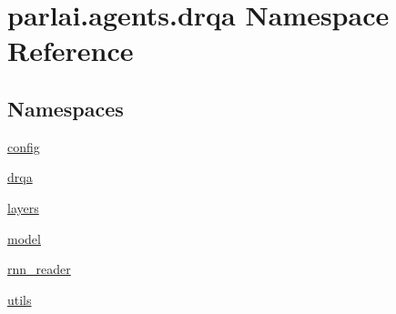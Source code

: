 \hypertarget{namespaceparlai_1_1agents_1_1drqa}{}\section{parlai.\+agents.\+drqa Namespace Reference}
\label{namespaceparlai_1_1agents_1_1drqa}
\subsection*{Namespaces}
\begin{DoxyCompactItemize}
\item 
 \hyperlink{namespaceparlai_1_1agents_1_1drqa_1_1config}{config}
\item 
 \hyperlink{namespaceparlai_1_1agents_1_1drqa_1_1drqa}{drqa}
\item 
 \hyperlink{namespaceparlai_1_1agents_1_1drqa_1_1layers}{layers}
\item 
 \hyperlink{namespaceparlai_1_1agents_1_1drqa_1_1model}{model}
\item 
 \hyperlink{namespaceparlai_1_1agents_1_1drqa_1_1rnn__reader}{rnn\+\_\+reader}
\item 
 \hyperlink{namespaceparlai_1_1agents_1_1drqa_1_1utils}{utils}
\end{DoxyCompactItemize}
